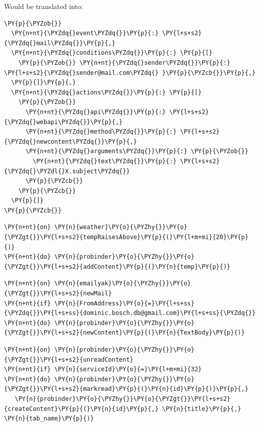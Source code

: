 Would be translated into:

\begin{Verbatim}[fontsize=\small,commandchars=\\\{\}]
\PY{p}{\PYZob{}}
  \PY{n+nt}{\PYZdq{}event\PYZdq{}}\PY{p}{:} \PY{l+s+s2}{\PYZdq{}mail\PYZdq{}}\PY{p}{,}
  \PY{n+nt}{\PYZdq{}conditions\PYZdq{}}\PY{p}{:} \PY{p}{[}
    \PY{p}{\PYZob{}} \PY{n+nt}{\PYZdq{}sender\PYZdq{}}\PY{p}{:} \PY{l+s+s2}{\PYZdq{}sender@mail.com\PYZdq{} }\PY{p}{\PYZcb{}}\PY{p}{,}
  \PY{p}{]}\PY{p}{,}
  \PY{n+nt}{\PYZdq{}actions\PYZdq{}}\PY{p}{:} \PY{p}{[}
    \PY{p}{\PYZob{}}
      \PY{n+nt}{\PYZdq{}api\PYZdq{}}\PY{p}{:} \PY{l+s+s2}{\PYZdq{}webapi\PYZdq{}}\PY{p}{,}
      \PY{n+nt}{\PYZdq{}method\PYZdq{}}\PY{p}{:} \PY{l+s+s2}{\PYZdq{}newcontent\PYZdq{}}\PY{p}{,}
      \PY{n+nt}{\PYZdq{}arguments\PYZdq{}}\PY{p}{:} \PY{p}{\PYZob{}}
        \PY{n+nt}{\PYZdq{}text\PYZdq{}}\PY{p}{:} \PY{l+s+s2}{\PYZdq{}\PYZdl{}X.subject\PYZdq{}}
      \PY{p}{\PYZcb{}}
    \PY{p}{\PYZcb{}}
  \PY{p}{]}
\PY{p}{\PYZcb{}}
\end{Verbatim}

\begin{Verbatim}[commandchars=\\\{\}]
\PY{n+nt}{on} \PY{n}{weather}\PY{o}{\PYZhy{}}\PY{o}{\PYZgt{}}\PY{l+s+s2}{tempRaisesAbove}\PY{p}{(}\PY{l+m+mi}{20}\PY{p}{)}
\PY{n+nt}{do} \PY{n}{probinder}\PY{o}{\PYZhy{}}\PY{o}{\PYZgt{}}\PY{l+s+s2}{addContent}\PY{p}{(}\PY{n}{temp}\PY{p}{)}
\end{Verbatim}

\begin{Verbatim}[commandchars=\\\{\}]
\PY{n+nt}{on} \PY{n}{emailyak}\PY{o}{\PYZhy{}}\PY{o}{\PYZgt{}}\PY{l+s+s2}{newMail}
\PY{n+nt}{if} \PY{n}{FromAddress}\PY{o}{=}\PY{l+s+ss}{\PYZdq{}}\PY{l+s+ss}{dominic.bosch.db@gmail.com}\PY{l+s+ss}{\PYZdq{}}
\PY{n+nt}{do} \PY{n}{probinder}\PY{o}{\PYZhy{}}\PY{o}{\PYZgt{}}\PY{l+s+s2}{newContent}\PY{p}{(}\PY{n}{TextBody}\PY{p}{)}
\end{Verbatim}

\begin{Verbatim}[commandchars=\\\{\}]
\PY{n+nt}{on} \PY{n}{probinder}\PY{o}{\PYZhy{}}\PY{o}{\PYZgt{}}\PY{l+s+s2}{unreadContent}
\PY{n+nt}{if} \PY{n}{serviceId}\PY{o}{=}\PY{l+m+mi}{32}
\PY{n+nt}{do} \PY{n}{probinder}\PY{o}{\PYZhy{}}\PY{o}{\PYZgt{}}\PY{l+s+s2}{markread}\PY{p}{(}\PY{n}{id}\PY{p}{)}\PY{p}{,}
   \PY{n}{probinder}\PY{o}{\PYZhy{}}\PY{o}{\PYZgt{}}\PY{l+s+s2}{createContent}\PY{p}{(}\PY{n}{id}\PY{p}{,} \PY{n}{title}\PY{p}{,} \PY{n}{tab_name}\PY{p}{)}
\end{Verbatim}

